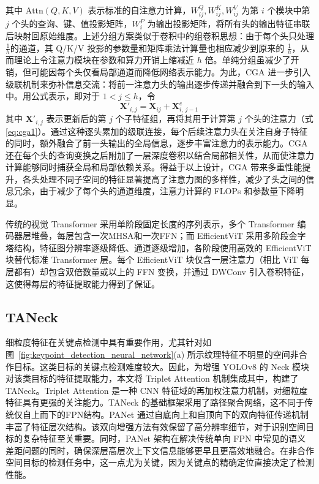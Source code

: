 其中 $\text{Attn}(Q,K,V)$ 表示标准的自注意力计算，$W^Q_{ij},W^K_{ij},W^V_{ij}$ 为第 $i$ 个模块中第 $j$ 个头的查询、键、值投影矩阵，$W^P_i$ 为输出投影矩阵，将所有头的输出特征串联后映射回原始维度。上述分组方案类似于卷积中的组卷积思想：由于每个头只处理$\frac{1}{h}$的通道，其 Q/K/V 投影的参数量和矩阵乘法计算量也相应减少到原来的 $\frac{1}{h}$，从而理论上令注意力模块在参数和算力开销上缩减近 $h$ 倍。单纯分组虽减少了开销，但可能因每个头仅看局部通道而降低网络表示能力。为此，CGA 进一步引入级联机制来弥补信息交流：将前一注意力头的输出逐步传递并融合到下一头的输入中。用公式表示，即对于 $1<j\le h$，令
\begin{equation}\label{eq:cga2}
	\mathbf{X}'_{i,j} = \mathbf{X}_{ij} + \mathbf{X}^{e}_{i,\,j-1}\,
\end{equation}
其中 $\mathbf{X}'_{i,j}$ 表示更新后的第 $j$ 个子特征组，再将其用于计算第 $j$ 个头的注意力（式\eqref{eq:cga1}）。通过这种逐头累加的级联连接，每个后续注意力头在关注自身子特征的同时，额外融合了前一头输出的全局信息，逐步丰富注意力的表示能力。CGA 还在每个头的查询变换之后附加了一层深度卷积以结合局部相关性，从而使注意力计算能够同时捕获全局和局部依赖关系。得益于以上设计，CGA 带来多重性能提升，各头处理不同子空间的特征显著提高了注意力图的多样性，减少了头之间的信息冗余，由于减少了每个头的通道维度，注意力计算的 FLOPs 和参数量下降明显。

传统的视觉 Transformer 采用单阶段固定长度的序列表示，多个 Transformer 编码器层堆叠，每层包含一次MHSA和一次FFN；而 EfficientViT 采用多阶段金字塔结构，特征图分辨率逐级降低、通道逐级增加，各阶段使用高效的 EfficientViT 块替代标准 Transformer 层。每个 EfficientViT 块仅含一层注意力（相比 ViT 每层都有）却包含双倍数量或以上的 FFN 变换，并通过 DWConv 引入卷积特征，这使得每层的特征提取能力得到了保证。

\subsection{TANeck}
细粒度特征在关键点检测中具有重要作用，尤其针对如图~\ref{fig:keypoint_detection_neural_network}(a) 所示纹理特征不明显的空间非合作目标。这类目标的关键点检测难度较大。因此，为增强 YOLOv8 的 Neck 模块对该类目标的特征提取能力，本文将 Triplet Attention \cite{Misra_2021_WACV} 机制集成其中，构建了 TANeck。Triplet Attention 是一种 CNN 特征域的再加权注意力机制，对细粒度特征具有更强的关注能力。TANeck 的基础框架采用了路径聚合网络，这不同于传统仅自上而下的FPN结构\cite{fpn}。PANet 通过自底向上和自顶向下的双向特征传递机制丰富了特征层次结构。该双向增强方法有效保留了高分辨率细节，对于识别空间目标的复杂特征至关重要。同时，PANet 架构在解决传统单向 FPN 中常见的语义差距问题的同时，确保深层高层次上下文信息能够更早且更高效地融合。在非合作空间目标的检测任务中，这一点尤为关键，因为关键点的精确定位直接决定了检测性能。

